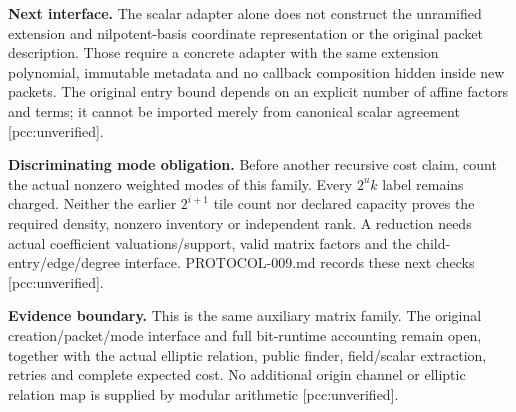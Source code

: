 \documentclass[10pt]{article}
\begin{document}
\textbf{Next interface.} The scalar adapter alone does not construct the
unramified extension and nilpotent-basis coordinate representation or the
original packet description. Those require a concrete adapter with the same
extension polynomial, immutable metadata and no callback composition hidden
inside new packets. The original entry bound depends on an explicit number
of affine factors and terms; it cannot be imported merely from canonical
scalar agreement [pcc:unverified].

\textbf{Discriminating mode obligation.} Before another recursive cost claim,
count the actual nonzero weighted modes of this family. Every $2^u k$ label
remains charged. Neither the earlier $2^{i+1}$ tile count nor declared capacity
proves the required density, nonzero inventory or independent rank. A reduction
needs actual coefficient valuations/support, valid matrix factors and the
child-entry/edge/degree interface. PROTOCOL-009.md records these next checks
[pcc:unverified].

\textbf{Evidence boundary.} This is the same auxiliary matrix family. The
original creation/packet/mode interface and full bit-runtime accounting remain
open, together with the actual elliptic relation, public finder, field/scalar
extraction, retries and complete expected cost. No additional origin channel
or elliptic relation map is supplied by modular arithmetic
[pcc:unverified].
\end{document}

